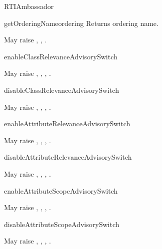 \begin{classdesc}{RTIAmbassador}{}
\begin{methoddesc}{getOrderingName}{ordering}
Returns ordering name.

May raise
,
,
.
\end{methoddesc}

\begin{methoddesc}{enableClassRelevanceAdvisorySwitch}{}

May raise
,
,
,
.
\end{methoddesc}

\begin{methoddesc}{disableClassRelevanceAdvisorySwitch}{}

May raise
,
,
,
.
\end{methoddesc}

\begin{methoddesc}{enableAttributeRelevanceAdvisorySwitch}{}

May raise
,
,
,
.
\end{methoddesc}

\begin{methoddesc}{disableAttributeRelevanceAdvisorySwitch}{}

May raise
,
,
,
.
\end{methoddesc}

\begin{methoddesc}{enableAttributeScopeAdvisorySwitch}{}

May raise
,
,
,
.
\end{methoddesc}

\begin{methoddesc}{disableAttributeScopeAdvisorySwitch}{}

May raise
,
,
,
.
\end{methoddesc}


\end{classdesc}
